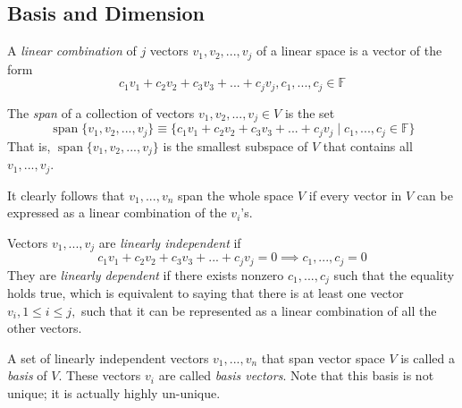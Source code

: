 \documentclass{article}
\DeclareMathOperator{\Span}{span}
\begin{document}
  \subsection{Basis and Dimension}

    \begin{definition}
      A \textit{linear combination} of $j$ vectors $v_1, v_2, ..., v_j$ of a linear space is a vector of the form 
      \begin{equation}
        c_1 v_1 + c_2 v_2 + c_3 v_3 + ... + c_j v_j, c_1, ..., c_j \in \mathbb{F}
      \end{equation}
    \end{definition}

    \begin{definition}[Span]
      The \textit{span} of a collection of vectors $v_1, v_2, ..., v_j \in V$ is the set
      \begin{equation}
        \Span \{ v_1, v_2, ..., v_j \} \equiv \{ c_1 v_1 + c_2 v_2 + c_3 v_3 + ... + c_j v_j\; | \; c_1, ..., c_j \in \mathbb{F}\}
      \end{equation}
      That is, $\Span \{v_1, v_2, ..., v_j\}$ is the smallest subspace of $V$ that contains all $v_1, ..., v_j$. 
    \end{definition}

    It clearly follows that $v_1, ..., v_n$ span the whole space $V$ if every vector in $V$ can be expressed as a linear combination of the $v_i$'s. 

    \begin{definition}
      Vectors $v_1, ..., v_j$ are \textit{linearly independent} if 
      \begin{equation}
        c_1 v_1 + c_2 v_2 + c_3 v_3 + ... + c_j v_j = 0 \implies c_1, ..., c_j = 0
      \end{equation}
      They are \textit{linearly dependent} if there exists nonzero $c_1, ..., c_j$ such that the equality holds true, which is equivalent to saying that there is at least one vector $v_i, 1 \leq i \leq j,$ such that it can be represented as a linear combination of all the other vectors. 
    \end{definition}

    \begin{definition}[Basis]
      A set of linearly independent vectors $v_1, ..., v_n$ that span vector space $V$ is called a \textit{basis} of $V$. These vectors $v_i$ are called \textit{basis vectors}. Note that this basis is not unique; it is actually highly un-unique. 
    \end{definition}
\end{document}
